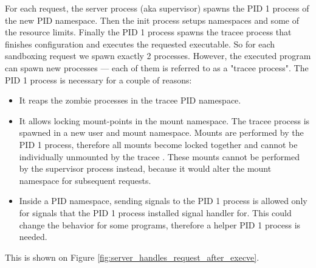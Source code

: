 \documentclass[en]{pracamgr}
\begin{document}
For each request, the server process (aka supervisor) spawns the PID 1 process of the new PID namespace. Then the init process setups namespaces and some of the resource limits. Finally the PID 1 process spawns the tracee process that finishes configuration and executes the requested executable. So for each sandboxing request we spawn exactly 2 processes. However, the executed program can spawn new processes --- each of them is referred to as a "tracee process". The PID 1 process is necessary for a couple of reasons:
\begin{itemize}
    \item It reaps the zombie processes in the tracee PID namespace.
    \item It allows locking mount-points in the mount namespace. The tracee process is spawned in a new user and mount namespace. Mounts are performed by the PID 1 process, therefore all mounts become locked together and cannot be individually unmounted by the tracee \cite{man_mount_namespaces}. These mounts cannot be performed by the supervisor process instead, because it would alter the mount namespace for subsequent requests.
    \item Inside a PID namespace, sending signals to the PID 1 process is allowed only for signals that the PID 1 process installed signal handler for. This could change the behavior for some programs, therefore a helper PID 1 process is needed.
\end{itemize}

This is shown on Figure \ref{fig:server_handles_request_after_execve}.
\end{document}
